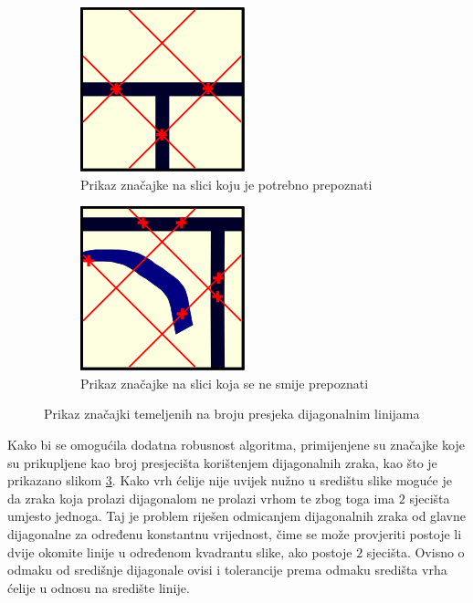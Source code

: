 \documentclass[times, utf8, zavrsni, numeric]{fer}
\begin{document}
\begin{figure}[th!]
    \centering
    \begin{subfigure}{.5\textwidth}
        \centering
        \includegraphics[width=.45\linewidth]{Images/Feature_true_3.png}
        \captionsetup{justification=centering}
        \caption{Prikaz značajke na slici koju je potrebno prepoznati}
        \label{fig:featureDemo3a}
    \end{subfigure}%
    \begin{subfigure}{.5\textwidth}
        \centering
        \includegraphics[width=.45\linewidth]{Images/Feature_false_3.png}
        \captionsetup{justification=centering}
        \caption{Prikaz značajke na slici koja se ne smije prepoznati}
        \label{fig:featureDemo3b}
    \end{subfigure}
    \caption{Prikaz značajki temeljenih na broju presjeka dijagonalnim linijama}
    \label{fig:featureDemo3}
\end{figure}

Kako bi se omogućila dodatna robusnost algoritma, primijenjene su značajke koje su prikupljene kao broj presjecišta korištenjem dijagonalnih zraka, kao što je prikazano slikom \ref{fig:featureDemo3}.
Kako vrh ćelije nije uvijek nužno u središtu slike moguće je da zraka koja prolazi dijagonalom ne prolazi vrhom te zbog toga ima $2$ sjecišta umjesto jednoga.
Taj je problem riješen odmicanjem dijagonalnih zraka od glavne dijagonalne za određenu konstantnu vrijednost, čime se može provjeriti postoje li dvije okomite linije u određenom kvadrantu slike, ako postoje $2$ sjecišta.
Ovisno o odmaku od središnje dijagonale ovisi i tolerancije prema odmaku središta vrha ćelije u odnosu na središte linije.\\
\end{document}
